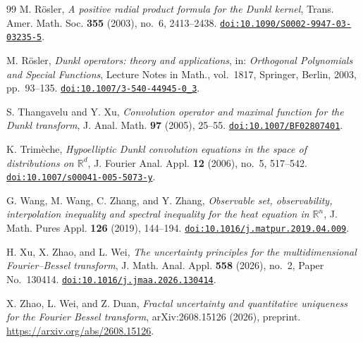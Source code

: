 \documentclass[12pt]{article}
\newcommand{\doi}[1]{\href{https://doi.org/#1}{\nolinkurl{doi:#1}}}
\begin{document}
\begin{thebibliography}{99}
M. R\"osler, \emph{A positive radial product formula for the Dunkl kernel}, Trans. Amer. Math. Soc. \textbf{355} (2003), no.~6, 2413--2438. \doi{10.1090/S0002-9947-03-03235-5}.

M. R\"osler, \emph{Dunkl operators: theory and applications}, in: \emph{Orthogonal Polynomials and Special Functions}, Lecture Notes in Math., vol.~1817, Springer, Berlin, 2003, pp.~93--135. \doi{10.1007/3-540-44945-0_3}.

S. Thangavelu and Y. Xu, \emph{Convolution operator and maximal function for the Dunkl transform}, J. Anal. Math. \textbf{97} (2005), 25--55. \doi{10.1007/BF02807401}.

K. Trim\`eche, \emph{Hypoelliptic Dunkl convolution equations in the space of distributions on $\mathbb{R}^d$}, J. Fourier Anal. Appl. \textbf{12} (2006), no.~5, 517--542. \doi{10.1007/s00041-005-5073-y}.

G. Wang, M. Wang, C. Zhang, and Y. Zhang, \emph{Observable set, observability, interpolation inequality and spectral inequality for the heat equation in $\mathbb{R}^n$}, J. Math. Pures Appl. \textbf{126} (2019), 144--194. \doi{10.1016/j.matpur.2019.04.009}.

H. Xu, X. Zhao, and L. Wei, \emph{The uncertainty principles for the multidimensional Fourier--Bessel transform}, J. Math. Anal. Appl. \textbf{558} (2026), no.~2, Paper No.~130414. \doi{10.1016/j.jmaa.2026.130414}.
 
X. Zhao, L. Wei, and Z. Duan, \emph{Fractal uncertainty and quantitative uniqueness for the Fourier Bessel transform}, arXiv:2608.15126 (2026), preprint. \url{https://arxiv.org/abs/2608.15126}.

\end{thebibliography}
\end{document}
